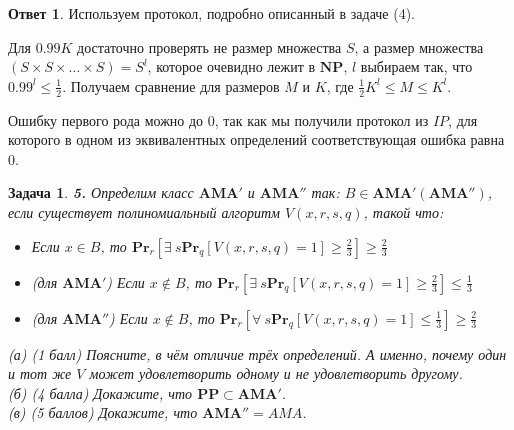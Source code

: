 \documentclass[a4paper]{article}
\theoremstyle{plain}
\newtheorem*{task}{Задача}
\theoremstyle{definition}
\newtheorem*{answer}{Ответ}
\begin{document}
\begin{answer}
Используем протокол, подробно описанный в задаче (4).


Для $0.99 K$ достаточно проверять не размер множества $S$, а размер множества $(S \times S \times \ldots \times S) = S^l$, которое очевидно лежит в $\mathbf{NP}$, $l$ выбираем так, что $0.99^l \leq \frac{1}{2}$. Получаем сравнение для размеров $M$ и $K$, где $\frac{1}{2} K^l \leq M \leq K^l$.

Ошибку первого рода можно до 0, так как мы получили протокол из $IP$, для которого в одном из эквивалентных определений соответствующая ошибка равна 0.  
\end{answer}


\begin{task} \textbf{5.}
Определим класс $\mathbf{AMA'}$ и $\mathbf{AMA''}$ так: $B \in \mathbf{AMA'} (\mathbf{AMA''})$, если существует полиномиальный алгоритм $V(x,r,s,q)$, такой что:
\begin{itemize}
\item Если $x \in B$, то $\mathbf{Pr}_r[\exists\ s \mathbf{Pr}_q [V(x,r,s,q)=1] \ge \frac{2}{3}] \ge \frac{2}{3}$
\item (для $\mathbf{AMA'}$) Если $x \notin B$, то $\mathbf{Pr}_r[\exists\ s \mathbf{Pr}_q [V(x,r,s,q)=1] \ge \frac{2}{3}] \le \frac{1}{3}$
\item (для $\mathbf{AMA''}$) Если $x \notin B$, то $\mathbf{Pr}_r[\forall\ s \mathbf{Pr}_q [V(x,r,s,q)=1] \le \frac{1}{3}] \ge \frac{2}{3}$
\end{itemize}
(а) (1 балл) Поясните, в чём отличие трёх определений. А именно, почему один и тот же $V$ может удовлетворить одному и не удовлетворить другому. \\
(б) (4 балла) Докажите, что $\mathbf{PP} \subset \mathbf{AMA'}$.\\
(в) (5 баллов) Докажите, что $\mathbf{AMA''}=AMA$.
\end{task}
\end{document}
